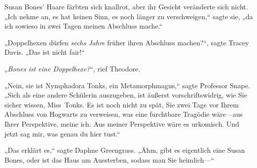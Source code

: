 Susan Bones' Haare färbten sich knallrot, aber ihr Gesicht veränderte sich nicht.
„Ich nehme an, es hat keinen Sinn, es noch länger zu verschweigen,“ sagte sie, „da ich sowieso in zwei Tagen meinen Abschluss mache.“

„Doppelhexen dürfen \emph{sechs Jahre} früher ihren Abschluss machen?“, sagte Tracey Davis. „Das ist nicht fair!“

„\emph{Bones ist eine Doppelhexe?}“, rief Theodore.

„Nein, sie ist Nymphadora Tonks, ein Metamorphmagus,“ sagte Professor Snape.
„Sich als eine andere Schülerin auszugeben, ist äußerst vorschriftswidrig, wie Sie sicher wissen, Miss~Tonks. Es ist noch nicht zu spät, Sie zwei Tage vor Ihrem Abschluss von Hogwarts zu verweisen, was eine furchtbare Tragödie wäre—aus Ihrer Perspektive, meine ich. Aus meiner Perspektive wäre es urkomisch. Und jetzt sag mir, was genau du hier tust.“

„Das erklärt es,“ sagte Daphne Greengrass.
„Ähm, gibt es eigentlich eine Susan Bones, oder ist das Haus am Aussterben, sodass man Sie heimlich—“

